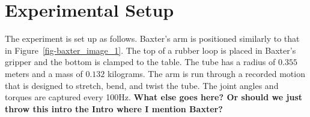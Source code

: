 \documentclass[letterpaper, 10pt, conference]{ieeeconf}
\begin{document}



\section{Experimental Setup}
The experiment is set up as follows.  Baxter's arm is positioned similarly to that in Figure~\ref{fig-baxter_image_1}.  The top of a rubber loop is placed in Baxter's gripper and the bottom is clamped to the table.  The tube has a radius of $0.355$ meters and a mass of $0.132$ kilograms.  The arm is run through a recorded motion that is designed to stretch, bend, and twist the tube. The joint angles and torques are captured every 100Hz.  \textbf{What else goes here? Or should we just throw this intro the Intro where I mention Baxter?}
\end{document}
